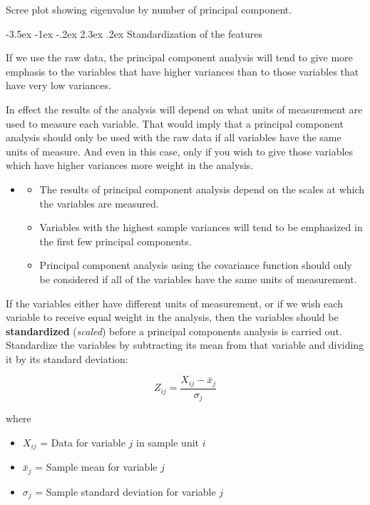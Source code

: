 \documentclass[]{book}
\makeatletter
\providecommand{\tightlist}{%
  \setlength{\itemsep}{0pt}\setlength{\parskip}{0pt}}
\newenvironment{rmdblock}[1]
  {\begin{shaded*}
  \begin{itemize}
  \renewcommand{\labelitemi}{
    \raisebox{-.7\height}[0pt][0pt]{
      {\setkeys{Gin}{width=2em,keepaspectratio}\texttt{[image: img/icons/\#1]}}
    }
  }
  \item
  }
  {
  \end{itemize}
  \end{shaded*}
  }
\newenvironment{rmdcaution}
  {\begin{rmdblock}{caution}}
  {\end{rmdblock}}
\renewcommand\section{\@startsection {section}{1}{\z@}%
                                   {-3.5ex \@plus -1ex \@minus -.2ex}%
                                   {2.3ex \@plus.2ex}%
                                   {\normalfont\Large\bfseries\color{ForestGreen}}}
\theoremstyle{definition}
\theoremstyle{definition}
\theoremstyle{definition}
\theoremstyle{remark}
\makeatother
\begin{document}
Scree plot showing eigenvalue by number of principal component.

\section{Standardization of the
features}\label{standardization-of-the-features}

If we use the raw data, the principal component analysis will tend to
give more emphasis to the variables that have higher variances than to
those variables that have very low variances.

In effect the results of the analysis will depend on what units of
measurement are used to measure each variable. That would imply that a
principal component analysis should only be used with the raw data if
all variables have the same units of measure. And even in this case,
only if you wish to give those variables which have higher variances
more weight in the analysis.

\begin{rmdcaution}
\begin{itemize}
\tightlist
\item
  The results of principal component analysis depend on the scales at
  which the variables are measured.
\item
  Variables with the highest sample variances will tend to be emphasized
  in the first few principal components.
\item
  Principal component analysis using the covariance function should only
  be considered if all of the variables have the same units of
  measurement.
\end{itemize}
\end{rmdcaution}

If the variables either have different units of measurement, or if we
wish each variable to receive equal weight in the analysis, then the
variables should be \textbf{standardized} (\emph{scaled}) before a
principal components analysis is carried out. Standardize the variables
by subtracting its mean from that variable and dividing it by its
standard deviation:

\[Z_{ij} = \frac{X_{ij}-\bar{x}_j}{\sigma_j}\]

where

\begin{itemize}
\tightlist
\item
  \(X_{ij}\) = Data for variable \(j\) in sample unit \(i\)
\item
  \(\bar{x}_j\) = Sample mean for variable \(j\)
\item
  \(\sigma_j\) = Sample standard deviation for variable \(j\)
\end{itemize}
\end{document}
